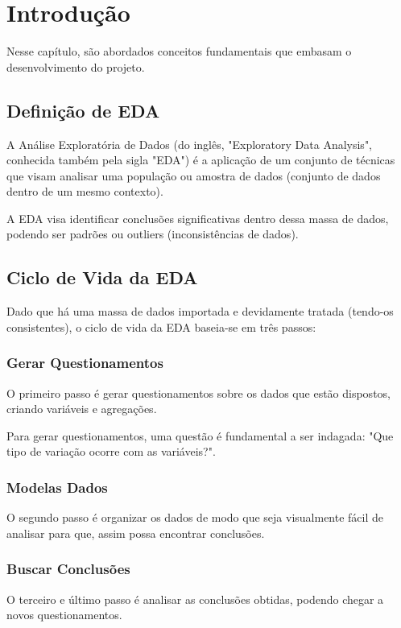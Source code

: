 \chapter{Introdução}	

Nesse capítulo, são abordados conceitos fundamentais que embasam o desenvolvimento do projeto.

\section{Definição de EDA}

A Análise Exploratória de Dados (do inglês, "Exploratory Data Analysis", conhecida também pela sigla "EDA") é a aplicação de um conjunto de técnicas que visam analisar uma população ou amostra de dados (conjunto de dados dentro de um mesmo contexto).

A EDA visa identificar conclusões significativas dentro dessa massa de dados, podendo ser padrões ou outliers (inconsistências de dados).

\section{Ciclo de Vida da EDA}

Dado que há uma massa de dados importada e devidamente tratada (tendo-os consistentes), o ciclo de vida da EDA baseia-se em três passos:

\subsection{Gerar Questionamentos}

O primeiro passo é gerar questionamentos sobre os dados que estão dispostos, criando variáveis e agregações.

Para gerar questionamentos, uma questão é fundamental a ser indagada: "Que tipo de variação ocorre com as variáveis?".

\subsection{Modelas Dados}

O segundo passo é organizar os dados de modo que seja visualmente fácil de analisar para que, assim possa encontrar conclusões.

\subsection{Buscar Conclusões}

O terceiro e último passo é analisar as conclusões obtidas, podendo chegar a novos questionamentos.




